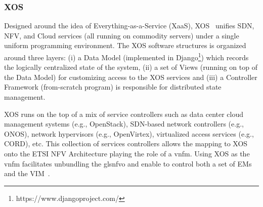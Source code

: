 \subsubsection{XOS}
Designed around the idea of Everything-as-a-Service (XaaS), XOS~\cite{peterson2015xos} unifies SDN, NFV, and Cloud services (all running on commodity servers) under a single uniform programming environment. The XOS software structures is organized around three layers: (i) a Data Model (implemented in Django\footnote{https://www.djangoproject.com/}) which records the logically centralized state of the system, (ii) a set of Views (running on top of the Data Model) for customizing access to the XOS services and (iii) a Controller Framework (from-scratch program) is responsible for distributed state management. 

XOS runs on the top of a mix of service controllers such as data center cloud management systems (e.g., OpenStack), SDN-based network controllers (e.g., ONOS), network hypervisors (e.g., OpenVirtex), virtualized access services (e.g., CORD), etc. This collection of services controllers allows the mapping to XOS onto the ETSI NFV Architecture playing the role of a \gls{vnfm}. Using XOS as the \gls{vnfm} facilitates unbundling the gls{nfvo} and enable to control both a set of EMs and the VIM~\cite{xos}.%



